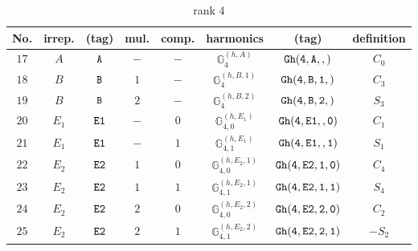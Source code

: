 \documentclass[fleqn,8pt]{jsarticle}
\begin{document}
\begin{table}[ht!]
\begin{center}
\caption{rank 4}
\renewcommand{\arraystretch}{1.3}
\begin{tabular}{cccccccc} \hline \hline
No. & irrep. & (tag) & mul. & comp. & harmonics & (tag) & definition \\ \hline
$ 17 $ & $ A $ & $ {\tt A} $ & $ - $ & $ - $ & $ \mathbb{G}_{4}^{(h,A)} $ & $ {\tt Gh(4,A,,)} $ & $ C_{0} $ \\
$ 18 $ & $ B $ & $ {\tt B} $ & $ 1 $ & $ - $ & $ \mathbb{G}_{4}^{(h,B,1)} $ & $ {\tt Gh(4,B,1,)} $ & $ C_{3} $ \\
$ 19 $ & $ B $ & $ {\tt B} $ & $ 2 $ & $ - $ & $ \mathbb{G}_{4}^{(h,B,2)} $ & $ {\tt Gh(4,B,2,)} $ & $ S_{3} $ \\
$ 20 $ & $ E_{1} $ & $ {\tt E1} $ & $ - $ & $ 0 $ & $ \mathbb{G}_{4,0}^{(h,E_{1})} $ & $ {\tt Gh(4,E1,,0)} $ & $ C_{1} $ \\
$ 21 $ & $ E_{1} $ & $ {\tt E1} $ & $ - $ & $ 1 $ & $ \mathbb{G}_{4,1}^{(h,E_{1})} $ & $ {\tt Gh(4,E1,,1)} $ & $ S_{1} $ \\
$ 22 $ & $ E_{2} $ & $ {\tt E2} $ & $ 1 $ & $ 0 $ & $ \mathbb{G}_{4,0}^{(h,E_{2},1)} $ & $ {\tt Gh(4,E2,1,0)} $ & $ C_{4} $ \\
$ 23 $ & $ E_{2} $ & $ {\tt E2} $ & $ 1 $ & $ 1 $ & $ \mathbb{G}_{4,1}^{(h,E_{2},1)} $ & $ {\tt Gh(4,E2,1,1)} $ & $ S_{4} $ \\
$ 24 $ & $ E_{2} $ & $ {\tt E2} $ & $ 2 $ & $ 0 $ & $ \mathbb{G}_{4,0}^{(h,E_{2},2)} $ & $ {\tt Gh(4,E2,2,0)} $ & $ C_{2} $ \\
$ 25 $ & $ E_{2} $ & $ {\tt E2} $ & $ 2 $ & $ 1 $ & $ \mathbb{G}_{4,1}^{(h,E_{2},2)} $ & $ {\tt Gh(4,E2,2,1)} $ & $ - S_{2} $ \\
 \hline \hline
\end{tabular}
\end{center}
\end{table}
\end{document}
